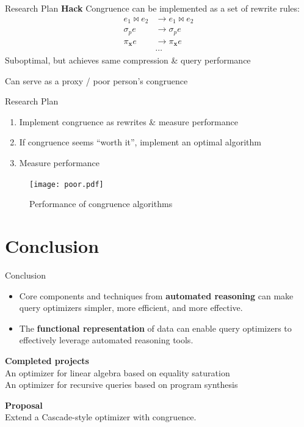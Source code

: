 \documentclass{beamer}
\begin{document}
  \begin{frame}{Research Plan}
    \textbf{Hack} Congruence can be implemented as a set of rewrite rules:
    \begin{align*}
      e_1 \bowtie e_2 & \rightarrow e_1 \bowtie e_2 \\
      \sigma_p e & \rightarrow \sigma_p e \\
      \pi_{\mathbf{x}} e & \rightarrow \pi_{\mathbf{x}} e \\
      & \cdots
    \end{align*} \pause
    Suboptimal, but achieves same compression \& query performance \pause
    
    Can serve as a proxy / poor person's congruence
  \end{frame}

  \begin{frame}{Research Plan}
    \begin{enumerate}
      \item Implement congruence as rewrites \& measure performance
      \item If congruence seems ``worth it'', implement an optimal algorithm
      \item Measure performance
    \end{enumerate} \pause
    \begin{figure}
      \texttt{[image: poor.pdf]}
      \caption*{Performance of congruence algorithms}
    \end{figure}
  \end{frame}

  \section{Conclusion}

  \begin{frame}{Conclusion}
    \begin{itemize}
      \item Core components and techniques from \textbf{automated reasoning}
      can make query optimizers simpler, more efficient,
      and more effective. 
      \item The \textbf{functional representation} of data can enable query 
      optimizers to effectively leverage automated reasoning tools.
    \end{itemize}
    \textbf{Completed projects} \\
    An optimizer for linear algebra based on equality saturation\\
    An optimizer for recursive queries based on program synthesis

    \textbf{Proposal} \\
    Extend a Cascade-style optimizer with congruence.
  \end{frame}
\end{document}
